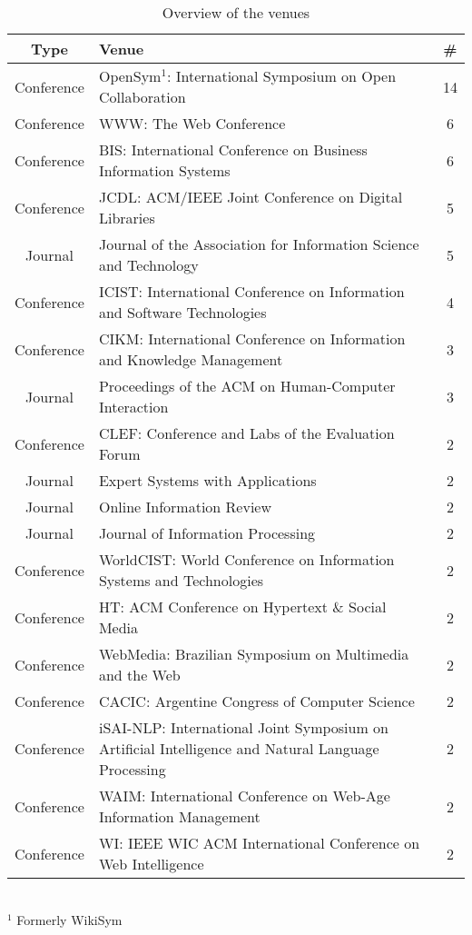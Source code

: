 \begin{table}[htbp]
    \caption{Overview of the venues}
    \label{tab:venues}
    \centering
    \begin{tabular}{c m{} c}
        \toprule
        \textbf{Type} & \textbf{Venue} & \textbf{\#} \\
        \midrule
        Conference & OpenSym$^1$: International Symposium on Open Collaboration & 14 \\
        Conference & WWW: The Web Conference & 6 \\
        Conference & BIS: International Conference on Business Information Systems & 6 \\
        Conference & JCDL: ACM/IEEE Joint Conference on Digital Libraries & 5 \\
        Journal & Journal of the Association for Information Science and Technology & 5 \\
        Conference & ICIST: International Conference on Information and Software Technologies & 4 \\
        Conference & CIKM: International Conference on Information and Knowledge Management & 3 \\
        Journal & Proceedings of the ACM on Human-Computer Interaction & 3 \\
        Conference & CLEF: Conference and Labs of the Evaluation Forum & 2 \\
        Journal & Expert Systems with Applications & 2 \\
        Journal & Online Information Review & 2 \\
        Journal & Journal of Information Processing & 2 \\
        Conference & WorldCIST: World Conference on Information Systems and Technologies & 2 \\
        Conference & HT: ACM Conference on Hypertext \& Social Media & 2 \\
        Conference & WebMedia: Brazilian Symposium on Multimedia and the Web & 2 \\
        Conference & CACIC: Argentine Congress of Computer Science & 2 \\
        Conference & iSAI-NLP: International Joint Symposium on Artificial Intelligence and Natural Language Processing & 2 \\
        Conference & WAIM: International Conference on Web-Age Information Management & 2 \\
        Conference & WI: IEEE WIC ACM International Conference on Web Intelligence & 2 \\
        \bottomrule
    \end{tabular}
    \\ \vspace{0.1cm}
    \footnotesize
    $^1$ Formerly WikiSym
\end{table}
